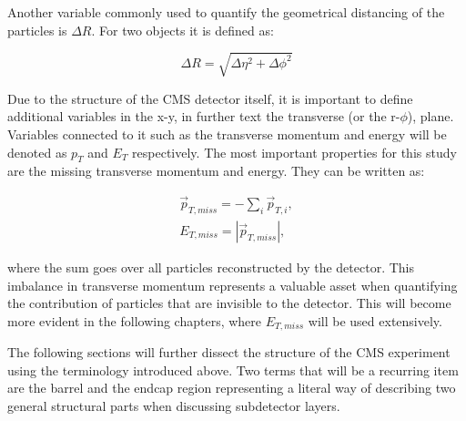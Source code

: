 Another variable commonly used to quantify the geometrical distancing of the particles is $\Delta R$. For two objects it is defined as:

\begin{equation}
\Delta R = \sqrt{\Delta\eta^2+\Delta\phi^2}
\end{equation}

Due to the structure of the CMS detector itself, it is important to define additional variables in the x-y, in further text the transverse (or the r-$\phi$), plane. Variables connected to it such as the transverse momentum and energy will be denoted as $p_T$ and $E_T$ respectively. The most important properties for this study are the missing transverse momentum and energy. They can be written as:

\begin{equation}
\begin{array}{l}
\vec{p}_{T, miss} = -\sum_i\vec{p}_{T,i},\\
E_{T, miss} = |\vec{p}_{T, miss} |,
\end{array}
\label{for:met}
\end{equation}

where the sum goes over all particles reconstructed by the detector. This imbalance in transverse momentum represents a valuable asset when quantifying the contribution of particles that are invisible to the detector. This will become more evident in the following chapters, where $E_{T,miss}$ will be used extensively. 


\hspace{10pt} The following sections will further dissect the structure of the CMS experiment using the terminology introduced above. Two terms that will be a recurring item are the barrel and the endcap region representing a literal way of describing two general structural parts when discussing subdetector layers.
 
